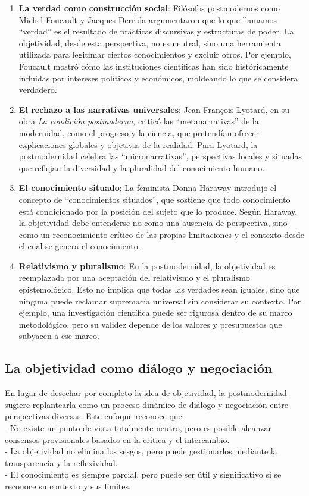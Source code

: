 \documentclass[
  letterpaper,
  DIV=11,
  numbers=noendperiod]{scrreprt}
\begin{document}
\begin{enumerate}
\def\labelenumi{\arabic{enumi}.}
\item
  \textbf{La verdad como construcción social}: Filósofos postmodernos
  como Michel Foucault y Jacques Derrida argumentaron que lo que
  llamamos ``verdad'' es el resultado de prácticas discursivas y
  estructuras de poder. La objetividad, desde esta perspectiva, no es
  neutral, sino una herramienta utilizada para legitimar ciertos
  conocimientos y excluir otros. Por ejemplo, Foucault mostró cómo las
  instituciones científicas han sido históricamente influidas por
  intereses políticos y económicos, moldeando lo que se considera
  verdadero.
\item
  \textbf{El rechazo a las narrativas universales}: Jean-François
  Lyotard, en su obra \emph{La condición postmoderna}, criticó las
  ``metanarrativas'' de la modernidad, como el progreso y la ciencia,
  que pretendían ofrecer explicaciones globales y objetivas de la
  realidad. Para Lyotard, la postmodernidad celebra las
  ``micronarrativas'', perspectivas locales y situadas que reflejan la
  diversidad y la pluralidad del conocimiento humano.
\item
  \textbf{El conocimiento situado}: La feminista Donna Haraway introdujo
  el concepto de ``conocimientos situados'', que sostiene que todo
  conocimiento está condicionado por la posición del sujeto que lo
  produce. Según Haraway, la objetividad debe entenderse no como una
  ausencia de perspectiva, sino como un reconocimiento crítico de las
  propias limitaciones y el contexto desde el cual se genera el
  conocimiento.
\item
  \textbf{Relativismo y pluralismo}: En la postmodernidad, la
  objetividad es reemplazada por una aceptación del relativismo y el
  pluralismo epistemológico. Esto no implica que todas las verdades sean
  iguales, sino que ninguna puede reclamar supremacía universal sin
  considerar su contexto. Por ejemplo, una investigación científica
  puede ser rigurosa dentro de su marco metodológico, pero su validez
  depende de los valores y presupuestos que subyacen a ese marco.
\end{enumerate}

\subsection{La objetividad como diálogo y
negociación}\label{la-objetividad-como-diuxe1logo-y-negociaciuxf3n}

En lugar de desechar por completo la idea de objetividad, la
postmodernidad sugiere replantearla como un proceso dinámico de diálogo
y negociación entre perspectivas diversas. Este enfoque reconoce que:\\
- No existe un punto de vista totalmente neutro, pero es posible
alcanzar consensos provisionales basados en la crítica y el
intercambio.\\
- La objetividad no elimina los sesgos, pero puede gestionarlos mediante
la transparencia y la reflexividad.\\
- El conocimiento es siempre parcial, pero puede ser útil y
significativo si se reconoce su contexto y sus límites.
\end{document}
